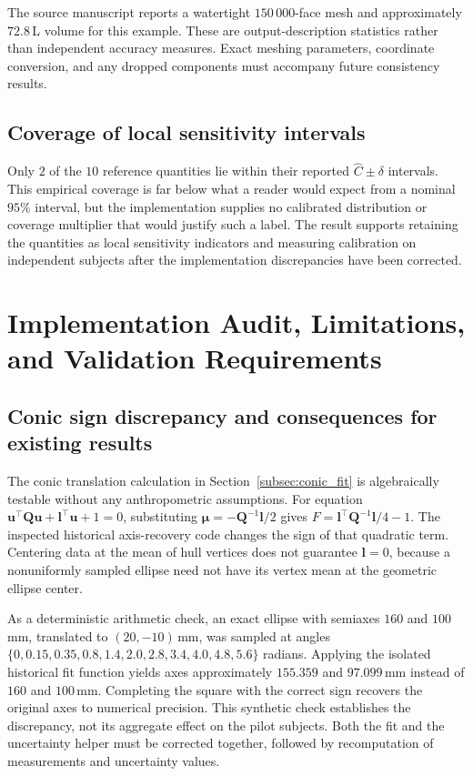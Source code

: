 \documentclass[11pt,a4paper]{article}
\numberwithin{equation}{section}
\begin{document}
The source manuscript reports a watertight $150\,000$-face mesh and approximately $72.8$\,L volume for this example. These are output-description statistics rather than independent accuracy measures. Exact meshing parameters, coordinate conversion, and any dropped components must accompany future consistency results.

\subsection{Coverage of local sensitivity intervals}
Only $2$ of the $10$ reference quantities lie within their reported $\hat C\pm\delta$ intervals. This empirical coverage is far below what a reader would expect from a nominal $95\%$ interval, but the implementation supplies no calibrated distribution or coverage multiplier that would justify such a label. The result supports retaining the quantities as local sensitivity indicators and measuring calibration on independent subjects after the implementation discrepancies have been corrected.

\section{Implementation Audit, Limitations, and Validation Requirements}
\label{sec:discussion}
\subsection{Conic sign discrepancy and consequences for existing results}
\label{subsec:conic_audit}
The conic translation calculation in Section~\ref{subsec:conic_fit} is algebraically testable without any anthropometric assumptions. For equation $\mathbf u^\top\mathbf Q\mathbf u+\mathbf l^\top\mathbf u+1=0$, substituting $\boldsymbol\mu=-\mathbf Q^{-1}\mathbf l/2$ gives $F=\mathbf l^\top\mathbf Q^{-1}\mathbf l/4-1$. The inspected historical axis-recovery code changes the sign of that quadratic term. Centering data at the mean of hull vertices does not guarantee $\mathbf l=0$, because a nonuniformly sampled ellipse need not have its vertex mean at the geometric ellipse center.

As a deterministic arithmetic check, an exact ellipse with semiaxes $160$ and $100$\,mm, translated to $(20,-10)$\,mm, was sampled at angles $\{0,0.15,0.35,0.8,1.4,2.0,2.8,3.4,4.0,4.8,5.6\}$ radians. Applying the isolated historical fit function yields axes approximately $155.359$ and $97.099$\,mm instead of $160$ and $100$\,mm. Completing the square with the correct sign recovers the original axes to numerical precision. This synthetic check establishes the discrepancy, not its aggregate effect on the pilot subjects. Both the fit and the uncertainty helper must be corrected together, followed by recomputation of measurements and uncertainty values.
\end{document}
